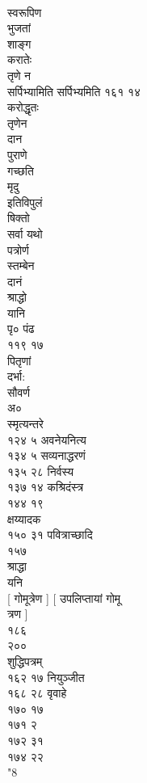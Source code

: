 \documentclass[11pt, openany]{book}
\begin{document}
{{{{{{{{{{{{{{{{{{{{{{{{{{{{{{{{{{{{{{{{{{{{{{{{{{{{{{{{{{{{{{{{{{{{{{{{{{{{{{{{{{{{{{{{{{{{{{{{{{{{{{{{{{{{{\\
स्वरूपिण\\
भुजतां\\
शाङ्ग\\
करातेः\\
तृणे }{न}{\\
सर्पिभ्यामिति सर्पिभ्यमिति १६१ १४\\
करोद्धृतः\\
तृणेन\\
दान\\
पुराणे\\
गच्छति\\
मृदु\\
इतिविपुलं\\
षिक्तो\\
सर्वा यथो\\
पत्रोर्ण\\
स्तम्बेन\\
दानं\\
श्राद्धो\\
यानि\\
पृ० पंढ\\
११९ १७\\
पितृणां\\
दर्भा:\\
सौवर्ण\\
अ०\\
स्मृत्यन्तरे\\
१२४ ५ अवनेयनित्य\\
१३४ ५ सव्यनाद्धरणं\\
१३५ २८ निर्वस्य\\
१३७ १४ कश्रिदंस्त्र\\
१४४ १९\\
क्षय्यादक\\
१५० ३१ \textbar{} पवित्राच्छादि\\
१५७\\
श्राद्धा\\
यनि\\
{[} गोमूत्रेण {]} {[} उपलिप्तायां गोमू\\
त्रण {]}\\
१८६\\
२००\\
शुद्धिपत्रम् \textbar{}\\
१६२ १७ नियुञ्जीत\\
१६८ २८ वृवाहे\\
१७० १७\\
१७१ २\\
१७२ ३१\\
१७४ २२\\
"8\\
}}}}}}}}}}}}}}}}}}}}}}}}}}}}}}}}}}}}}}}}}}}}}}}}}}}}}}}}}}}}}}}}}}}}}}}}}}}}}}}}}}}}}}}}}}}}}}}}}}}}}}}}}}}}}
\end{document}
